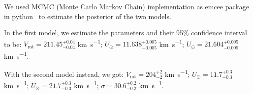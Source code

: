 We used MCMC (Monte Carlo Markov Chain) implementation as emcee package in python~\cite{EMCEE} to estimate the posterior of the two models. 

In the first model, we estimate the parameters and their 95\% confidence interval to be: %
$V_{\text{rot}} = 211.45_{-0.04}^{+0.04}$ \unit{\kilo\meter\per\second};  
$U_{\odot} = 11.638_{-0.005}^{+0.005}$ \unit{\kilo\meter\per\second};  
$U_{\odot} = 21.604_{-0.005}^{+0.005}$ \unit{\kilo\meter\per\second}.  

With the second model instead, we got:  
$V_{\text{rot}} = 204_{-2}^{+2}$ \unit{\kilo\meter\per\second};  
$U_{\odot} = 11.7_{-0.3}^{+0.3}$ \unit{\kilo\meter\per\second};  
$U_{\odot} = 21.7_{-0.3}^{+0.3}$ \unit{\kilo\meter\per\second};  
$\sigma = 30.6_{-0.2}^{+0.2}$ \unit{\kilo\meter\per\second}.  

